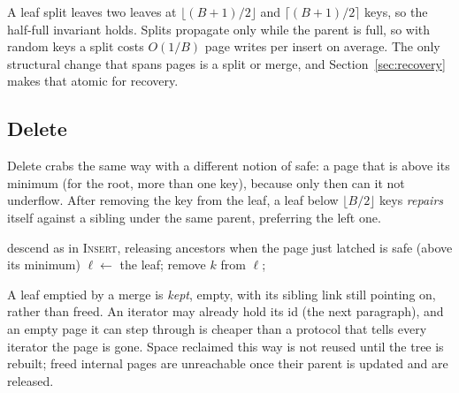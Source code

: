 \documentclass[sigconf, nonacm]{acmart}
\begin{document}
A leaf split leaves two leaves at $\lfloor (B{+}1)/2\rfloor$ and $\lceil (B{+}1)/2\rceil$ keys, so the half-full invariant holds. Splits propagate only while the parent is full, so with random keys a split costs $O(1/B)$ page writes per insert on average. The only structural change that spans pages is a split or merge, and Section~\ref{sec:recovery} makes that atomic for recovery.

\subsection{Delete}

Delete crabs the same way with a different notion of safe: a page that is above its minimum (for the root, more than one key), because only then can it not underflow. After removing the key from the leaf, a leaf below $\lfloor B/2\rfloor$ keys \emph{repairs} itself against a sibling under the same parent, preferring the left one.

\begin{algorithm}[t]
\caption{\textsc{Remove}$(k)$}\label{alg:remove}
\small
descend as in \textsc{Insert}, releasing ancestors when the page just latched is safe (above its minimum)\;
$\ell \gets$ the leaf; 
remove $k$ from $\ell$; 
\end{algorithm}

A leaf emptied by a merge is \emph{kept}, empty, with its sibling link still pointing on, rather than freed. An iterator may already hold its id (the next paragraph), and an empty page it can step through is cheaper than a protocol that tells every iterator the page is gone. Space reclaimed this way is not reused until the tree is rebuilt; freed internal pages are unreachable once their parent is updated and are released.
\end{document}
